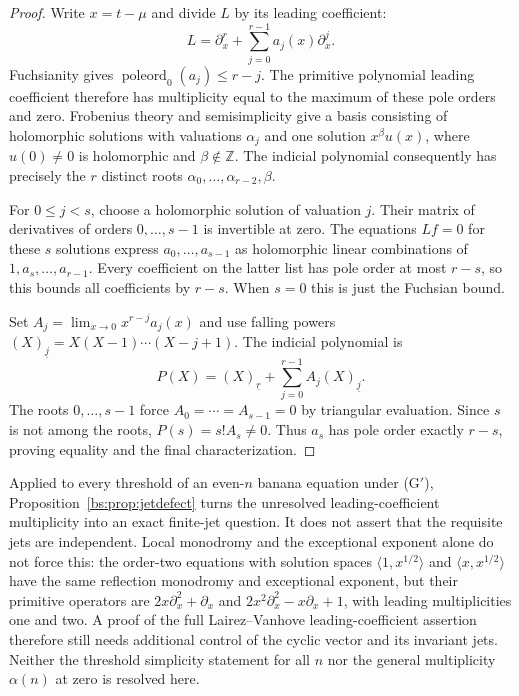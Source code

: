 \documentclass[11pt,a4paper]{article}
\theoremstyle{definition}
\theoremstyle{remark}
\numberwithin{equation}{section}
\begin{document}
\begin{proof}
Write $x=t-\mu$ and divide $L$ by its leading coefficient:
\[
L=\partial_x^r+\sum_{j=0}^{r-1}a_j(x)\partial_x^j.
\]
Fuchsianity gives $\operatorname{poleord}_0(a_j)\le r-j$. The primitive polynomial leading coefficient therefore has multiplicity equal to the maximum of these pole orders and zero. Frobenius theory and semisimplicity give a basis consisting of holomorphic solutions with valuations $\alpha_j$ and one solution $x^\beta u(x)$, where $u(0)\ne0$ is holomorphic and $\beta\notin\mathbb Z$. The indicial polynomial consequently has precisely the $r$ distinct roots $\alpha_0,\ldots,\alpha_{r-2},\beta$.

For $0\le j<s$, choose a holomorphic solution of valuation $j$. Their matrix of derivatives of orders $0,\ldots,s-1$ is invertible at zero. The equations $Lf=0$ for these $s$ solutions express $a_0,\ldots,a_{s-1}$ as holomorphic linear combinations of $1,a_s,\ldots,a_{r-1}$. Every coefficient on the latter list has pole order at most $r-s$, so this bounds all coefficients by $r-s$. When $s=0$ this is just the Fuchsian bound.

Set $A_j=\lim_{x\to0}x^{r-j}a_j(x)$ and use falling powers $(X)_{\underline j}=X(X-1)\cdots(X-j+1)$. The indicial polynomial is
\[
P(X)=(X)_{\underline r}+\sum_{j=0}^{r-1}A_j(X)_{\underline j}.
\]
The roots $0,\ldots,s-1$ force $A_0=\cdots=A_{s-1}=0$ by triangular evaluation. Since $s$ is not among the roots, $P(s)=s!A_s\ne0$. Thus $a_s$ has pole order exactly $r-s$, proving equality and the final characterization.
\end{proof}

Applied to every threshold of an even-$n$ banana equation under {\rm(G$'$)}, Proposition~\ref{bs:prop:jetdefect} turns the unresolved leading-coefficient multiplicity into an exact finite-jet question. It does not assert that the requisite jets are independent. Local monodromy and the exceptional exponent alone do not force this: the order-two equations with solution spaces $\langle1,x^{1/2}\rangle$ and $\langle x,x^{1/2}\rangle$ have the same reflection monodromy and exceptional exponent, but their primitive operators are $2x\partial_x^2+\partial_x$ and $2x^2\partial_x^2-x\partial_x+1$, with leading multiplicities one and two. A proof of the full Lairez--Vanhove leading-coefficient assertion therefore still needs additional control of the cyclic vector and its invariant jets. Neither the threshold simplicity statement for all $n$ nor the general multiplicity $\alpha(n)$ at zero is resolved here.
\end{document}
